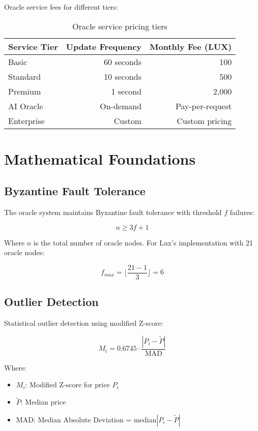 \documentclass[11pt]{article}
\begin{document}
Oracle service fees for different tiers:

\begin{table}[h]
\centering
\begin{tabular}{lrr}
\toprule
\textbf{Service Tier} & \textbf{Update Frequency} & \textbf{Monthly Fee (LUX)} \\
\midrule
Basic & 60 seconds & 100 \\
Standard & 10 seconds & 500 \\
Premium & 1 second & 2,000 \\
AI Oracle & On-demand & Pay-per-request \\
Enterprise & Custom & Custom pricing \\
\bottomrule
\end{tabular}
\caption{Oracle service pricing tiers}
\end{table}

\section{Mathematical Foundations}

\subsection{Byzantine Fault Tolerance}

The oracle system maintains Byzantine fault tolerance with threshold $f$ failures:

\begin{equation}
n \geq 3f + 1
\end{equation}

Where $n$ is the total number of oracle nodes. For Lux's implementation with 21 oracle nodes:

\begin{equation}
f_{max} = \lfloor \frac{21 - 1}{3} \rfloor = 6
\end{equation}

\subsection{Outlier Detection}

Statistical outlier detection using modified Z-score:

\begin{equation}
M_i = 0.6745 \cdot \frac{|P_i - \tilde{P}|}{\text{MAD}}
\end{equation}

Where:
\begin{itemize}
    \item $M_i$: Modified Z-score for price $P_i$
    \item $\tilde{P}$: Median price
    \item MAD: Median Absolute Deviation = median$|P_i - \tilde{P}|$
\end{itemize}
\end{document}
